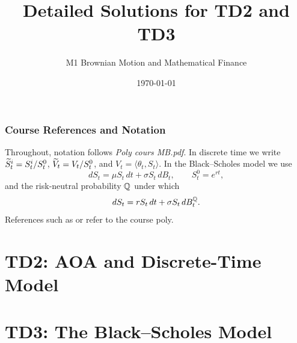 \documentclass[11pt,a4paper]{article}
\title{Detailed Solutions for TD2 and TD3}
\author{M1 Brownian Motion and Mathematical Finance}
\date{\today}
\begin{document}
\maketitle
\tableofcontents
\newpage

\section*{Course References and Notation}
Throughout, notation follows \emph{Poly cours MB.pdf}.  In discrete time we write
\(\widetilde S^i_t=S^i_t/S^0_t\), \(\widetilde V_t=V_t/S^0_t\), and
\(V_t=\langle \theta_t,S_t\rangle\).  In the Black--Scholes model we use
\[
  dS_t=\mu S_t\,dt+\sigma S_t\,dB_t,\qquad S^0_t=e^{rt},
\]
and the risk-neutral probability \(\mathbb{Q}\) under which
\[
  dS_t=rS_t\,dt+\sigma S_t\,dB_t^{\mathbb{Q}}.
\]
References such as  or  refer to the
course poly.

\part{TD2: AOA and Discrete-Time Model}

















\part{TD3: The Black--Scholes Model}









\end{document}
